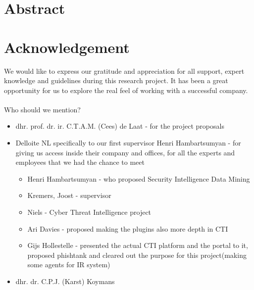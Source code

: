 \documentclass[12pt]{article}
\begin{document}
\section*{Abstract}
\newpage
\section*{Acknowledgement}

We would like to express our gratitude and appreciation for all support, expert knowledge and guidelines during this research project. It has been a great opportunity for us to explore the real feel of working with a successful company. 
\\
\\
Who should we mention? 
\begin{itemize}
\item{dhr. prof. dr. ir. C.T.A.M. (Cees) de Laat - for the project proposals}
\item{Delloite NL specifically to our first supervisor Henri Hambartsumyan - for giving us access inside their company and offices, for all the experts and employees that we had the chance to meet}
 \begin{itemize}
 \item{Henri Hambartsumyan - who proposed Security Intelligence Data Mining}
 \item{Kremers, Joost  - supervisor }
 \item{Niels - Cyber Threat Intelligence project}
 \item{Ari Davies - proposed making the plugins also more depth in CTI }
 \item{Gijs Hollestelle - presented the actual CTI platform and the portal to it, proposed phishtank and cleared out the purpose for this project(making some agents for IR system) }
 \end{itemize}
\item{dhr. dr. C.P.J. (Karst) Koymans}
\end{itemize}


 
\newpage

\tableofcontents
\newpage
\end{document}

